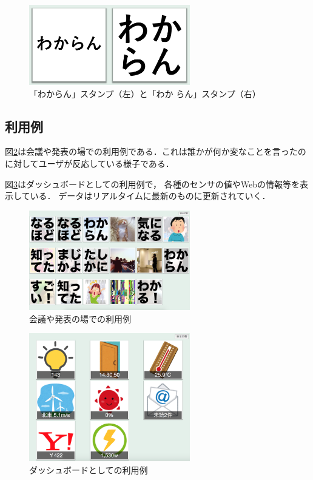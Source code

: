 \begin{figure}[h]
\centering
\includegraphics[width=7cm]{images/wakaran.png}
\caption{「わからん」スタンプ（左）と「わか らん」スタンプ（右）}
\label{wakaran}
\end{figure}

\subsection{利用例}
図\ref{discussion}は会議や発表の場での利用例である．これは誰かが何か変なことを言ったのに対してユーザが反応している様子である．

図\ref{sensors}はダッシュボードとしての利用例で，
各種のセンサの値やWebの情報等を表示している．
データはリアルタイムに最新のものに更新されていく．

\begin{figure}[h]
\centering
\includegraphics[width=7cm]{images/discussion.png}
\caption{会議や発表の場での利用例}
\label{discussion}
\end{figure}

\begin{figure}[h]
\centering
\includegraphics[width=7cm]{images/sensors.png}
\caption{ダッシュボードとしての利用例}
\label{sensors}
\end{figure}

